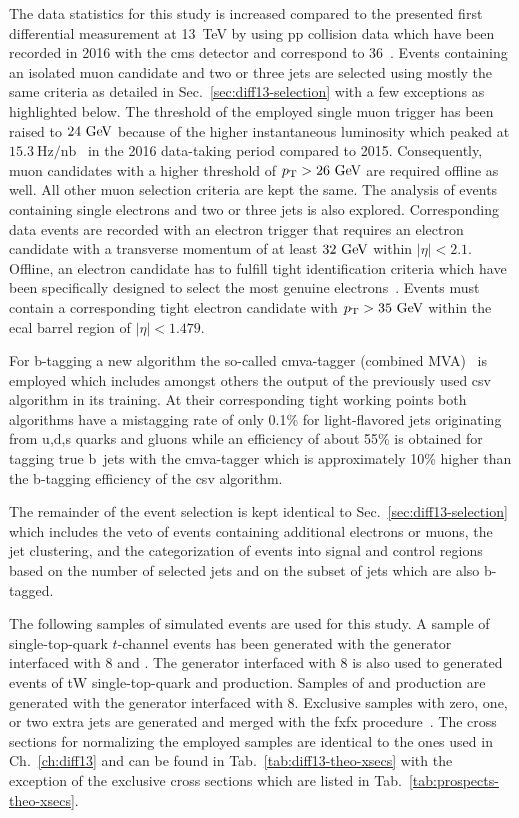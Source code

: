 The data statistics for this study is increased compared to the presented first differential measurement at 13~TeV by using \gls{pp} collision data which have been recorded in 2016 with the \gls{cms} detector and correspond to 36~\invfb. Events containing an isolated muon candidate and two or three jets are selected using mostly the same criteria as detailed in Sec.~\ref{sec:diff13-selection} with a few exceptions as highlighted below. The threshold of the employed single muon trigger has been raised to $24~\textrm{GeV}$ because of the higher instantaneous luminosity which peaked at $15.3~\mathrm{Hz}/\mathrm{nb}$~\cite{lumipublic} in the 2016 data-taking period compared to 2015. Consequently, muon candidates with a higher threshold of $p_\textrm{T}>26~\textrm{GeV}$ are required offline as well. All other muon selection criteria are kept the same. The analysis of events containing single electrons and two or three jets is also explored. Corresponding data events are recorded with an electron trigger that requires an electron candidate with a transverse momentum of at least $32~\textrm{GeV}$ within $|\eta|<2.1$. Offline, an electron candidate has to fulfill tight identification criteria which have been specifically designed to select the most genuine electrons~\cite{CMS-DP-2017-004}. Events must contain a corresponding tight electron candidate with $p_\textrm{T}>35~\textrm{GeV}$ within the \gls{ecal} barrel region of $|\eta|<1.479$.

For b-tagging a new algorithm the so-called \gls{cmva}-tagger (combined MVA)~\cite{CMS-PAS-BTV-15-001} is employed which includes amongst others the output of the previously used \gls{csv} algorithm in its training. At their corresponding tight working points both algorithms have a mistagging rate of only 0.1\% for light-flavored jets originating from u,d,s quarks and gluons while an efficiency of about 55\% is obtained for tagging true b~jets with the \gls{cmva}-tagger which is approximately 10\% higher than the b-tagging efficiency of the \gls{csv} algorithm. 

The remainder of the event selection is kept identical to Sec.~\ref{sec:diff13-selection} which includes the veto of events containing additional electrons or muons, the jet clustering, and the categorization of events into signal and control regions based on the number of selected jets and on the subset of jets which are also b-tagged.

The following samples of simulated events are used for this study. A sample of single-top-quark $t$-channel events has been generated with the \POWHEG generator interfaced with \PYTHIA{}8 and \MADSPIN. The \POWHEG generator interfaced with \PYTHIA{}8 is also used to generated events of tW single-top-quark and \ttbar production. Samples of \wjets and \zjets production are generated with the \MGAMC generator interfaced with \PYTHIA{}8. Exclusive \wjets samples with zero, one, or two extra jets are generated and merged with the \gls{fxfx} procedure~\cite{Frederix:2012ps}. The cross sections for normalizing the employed samples are identical to the ones used in Ch.~\ref{ch:diff13} and can be found in Tab.~\ref{tab:diff13-theo-xsecs} with the exception of the exclusive \wjets cross sections which are listed in Tab.~\ref{tab:prospects-theo-xsecs}.


